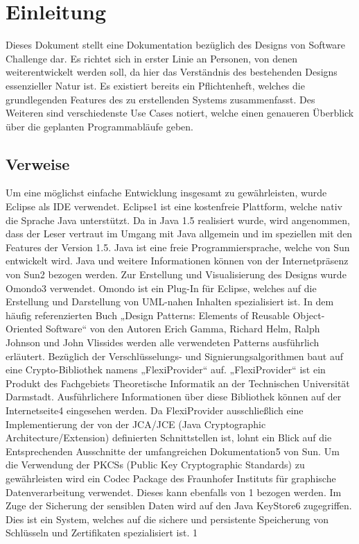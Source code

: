 \section{Einleitung}
Dieses Dokument stellt eine Dokumentation bezüglich des Designs von Software Challenge dar. Es richtet sich
in erster Linie an Personen, von denen weiterentwickelt werden soll, da hier das Verständnis des
bestehenden Designs essenzieller Natur ist.
Es existiert bereits ein Pflichtenheft, welches die grundlegenden Features des zu erstellenden Systems
zusammenfasst. Des Weiteren sind verschiedenste Use Cases notiert, welche einen genaueren
Überblick über die geplanten Programmabläufe geben.

\subsection{Verweise}
Um eine möglichst einfache Entwicklung insgesamt zu gewährleisten, wurde Eclipse als IDE verwendet.
Eclipse1 ist eine kostenfreie Plattform, welche nativ die Sprache Java unterstützt.
Da in Java 1.5 realisiert wurde, wird angenommen, dass der Leser vertraut im Umgang mit Java
allgemein und im speziellen mit den Features der Version 1.5. Java ist eine freie Programmiersprache,
welche von Sun entwickelt wird. Java und weitere Informationen können von der Internetpräsenz von
Sun2 bezogen werden.
Zur Erstellung und Visualisierung des Designs wurde Omondo3 verwendet. Omondo ist ein Plug-In für
Eclipse, welches auf die Erstellung und Darstellung von UML-nahen Inhalten spezialisiert ist.
In dem häufig referenzierten Buch „Design Patterns: Elements of Reusable Object-Oriented Software“
von den Autoren Erich Gamma, Richard Helm, Ralph Johnson und John Vlissides werden alle
verwendeten Patterns ausführlich erläutert.
Bezüglich der Verschlüsselungs- und Signierungsalgorithmen baut auf eine Crypto-Bibliothek namens
„FlexiProvider“ auf. „FlexiProvider“ ist ein Produkt des Fachgebiets Theoretische Informatik an der
Technischen Universität Darmstadt. Ausführlichere Informationen über diese Bibliothek können auf der
Internetseite4 eingesehen werden. Da FlexiProvider ausschließlich eine Implementierung der von der
JCA/JCE (Java Cryptographic Architecture/Extension) definierten Schnittstellen ist, lohnt ein Blick auf
die Entsprechenden Ausschnitte der umfangreichen Dokumentation5 von Sun.
Um die Verwendung der PKCSs (Public Key Cryptographic Standards) zu gewährleisten wird ein
Codec Package des Fraunhofer Instituts für graphische Datenverarbeitung verwendet. Dieses kann
ebenfalls von 1 bezogen werden.
Im Zuge der Sicherung der sensiblen Daten wird auf den Java KeyStore6 zugegriffen. Dies ist ein
System, welches auf die sichere und persistente Speicherung von Schlüsseln und Zertifikaten
spezialisiert ist.
1

